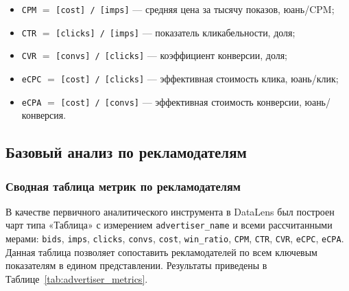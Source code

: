 \begin{itemize}
    \item \texttt{CPM} $=$ \texttt{[cost] / [imps]} --- средняя цена за тысячу показов, юань/CPM;
    \item \texttt{CTR} $=$ \texttt{[clicks] / [imps]} --- показатель кликабельности, доля;
    \item \texttt{CVR} $=$ \texttt{[convs] / [clicks]} --- коэффициент конверсии, доля;
    \item \texttt{eCPC} $=$ \texttt{[cost] / [clicks]} --- эффективная стоимость клика, юань/клик;
    \item \texttt{eCPA} $=$ \texttt{[cost] / [convs]} --- эффективная стоимость конверсии, юань/конверсия.
\end{itemize}

\subsection{Базовый анализ по рекламодателям}
\label{subsec:datalens_analysis}

\subsubsection*{Сводная таблица метрик по рекламодателям}

В качестве первичного аналитического инструмента в DataLens был построен чарт типа «Таблица» с измерением \texttt{advertiser\_name} и всеми рассчитанными мерами: \texttt{bids}, \texttt{imps}, \texttt{clicks}, \texttt{convs}, \texttt{cost}, \texttt{win\_ratio}, \texttt{CPM}, \texttt{CTR}, \texttt{CVR}, \texttt{eCPC}, \texttt{eCPA}. Данная таблица позволяет сопоставить рекламодателей по всем ключевым показателям в едином представлении. Результаты приведены в Таблице~\ref{tab:advertiser_metrics}.

